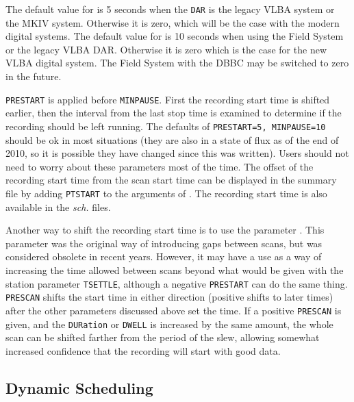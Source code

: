 \documentclass{report}
\begin{document}
The default value for  is 5 seconds
when the {\tt DAR} is the legacy VLBA system or the MKIV system.  Otherwise
it is zero, which will be the case with the modern digital systems.  The
default value for  is 10 seconds 
when using the Field System or the legacy VLBA DAR.  Otherwise it is
zero which is the case for the new VLBA digital system.  The Field System
with the DBBC may be switched to zero in the future.

{\tt PRESTART} is applied before {\tt MINPAUSE}.  First the recording
start time is shifted earlier, then the interval from the last
stop time is examined to determine if the recording should be left
running.  The defaults of {\tt PRESTART=5, MINPAUSE=10} should
be ok in most situations (they are also in a state of flux as of the
end of 2010, so it is possible they have changed since this was
written).  Users should not need to worry about
these parameters most of the time.  The offset of the recording start
time from the scan start time can be displayed in the summary
file by adding {\tt PTSTART} to the arguments of .  The recording start time is also available in
the {\sl sch.} files.

Another way to shift the recording start time is to use the parameter
.  This parameter was the original
way of introducing gaps between scans, but was considered obsolete in
recent years. However, it may have a use as a way of increasing the
time allowed between scans beyond what would be given with the station
parameter {\tt TSETTLE}, although a negative {\tt PRESTART} can do
the same thing.  {\tt PRESCAN} shifts the start time in
either direction (positive shifts to later times) after the other
parameters discussed above set the time.  If a positive {\tt PRESCAN}
is given, and the {\tt DURation} or {\tt DWELL} is increased by the
same amount, the whole scan can be shifted farther from the period of
the slew, allowing somewhat increased confidence that the recording
will start with good data.

\subsection{\label{SSEC:DYNAMIC}Dynamic Scheduling}
\end{document}
